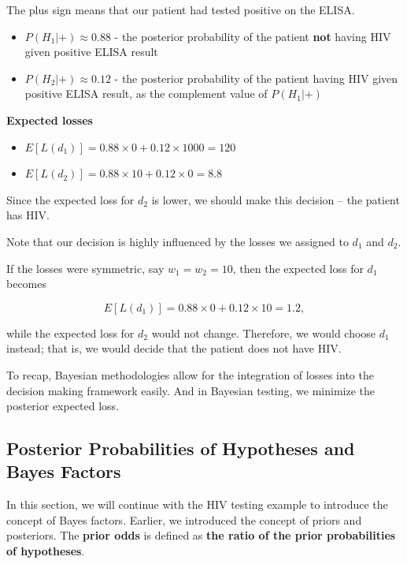 \documentclass[]{book}
\providecommand{\tightlist}{%
  \setlength{\itemsep}{0pt}\setlength{\parskip}{0pt}}
\theoremstyle{definition}
\theoremstyle{definition}
\theoremstyle{definition}
\theoremstyle{remark}
\begin{document}
The plus sign means that our patient had tested positive on the ELISA.

\begin{itemize}
\tightlist
\item
  \(P(H_1|+) \approx 0.88\) - the posterior probability of the patient
  \textbf{not} having HIV given positive ELISA result
\item
  \(P(H_2|+) \approx 0.12\) - the posterior probability of the patient
  having HIV given positive ELISA result, as the complement value of
  \(P(H_1|+)\)
\end{itemize}

\textbf{Expected losses}

\begin{itemize}
\tightlist
\item
  \(E[L(d_1)] = 0.88 \times 0 + 0.12 \times 1000 = 120\)
\item
  \(E[L(d_2)] = 0.88 \times 10 + 0.12 \times 0 = 8.8\)
\end{itemize}

Since the expected loss for \(d_2\) is lower, we should make this
decision -- the patient has HIV.

Note that our decision is highly influenced by the losses we assigned to
\(d_1\) and \(d_2\).

If the losses were symmetric, say \(w_1 = w_2 = 10\), then the expected
loss for \(d_1\) becomes

\[E[L(d_1)] = 0.88 \times 0 + 0.12 \times 10 = 1.2,\]

while the expected loss for \(d_2\) would not change. Therefore, we
would choose \(d_1\) instead; that is, we would decide that the patient
does not have HIV.

To recap, Bayesian methodologies allow for the integration of losses
into the decision making framework easily. And in Bayesian testing, we
minimize the posterior expected loss.

\subsection{Posterior Probabilities of Hypotheses and Bayes
Factors}\label{sec:bayes-factors}

In this section, we will continue with the HIV testing example to
introduce the concept of Bayes factors. Earlier, we introduced the
concept of priors and posteriors. The \textbf{prior odds} is defined as
\textbf{the ratio of the prior probabilities of hypotheses}.
\end{document}
